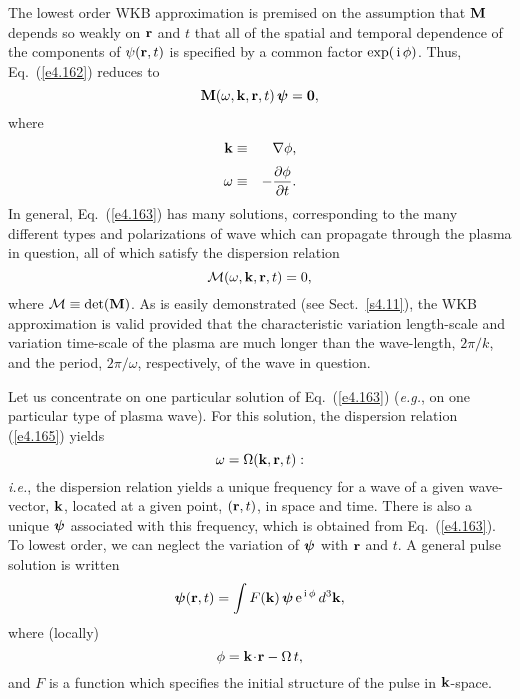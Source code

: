 The lowest order WKB  approximation  is premised on the assumption that
${\bf M}$ depends so weakly on ${\bf r}$ and $t$ that all of the
spatial and temporal dependence of the components of ${\bf \psi}({\bf r}, t)$
is specified by a common factor $\exp(\,{\rm i}\,\phi)$.
Thus,
Eq.~(\ref{e4.162}) reduces to
\begin{equation}\label{e4.163}
{\bf M}(\omega, {\bf k}, {\bf r}, t)\, {\mbox{\boldmath$\psi$}} = {\bf 0},
\end{equation}
where
\begin{eqnarray}\label{e4.164a}
{\bf k} &\equiv & \nabla\phi,\\[0.5ex]
\omega &\equiv & - \frac{\partial\phi}{\partial t}.\label{e4.164b}
\end{eqnarray}
In general, Eq.~(\ref{e4.163}) has many solutions, corresponding to the many different
types and polarizations of wave which can propagate through the plasma in question,
all of which satisfy the dispersion relation
\begin{equation}\label{e4.165}
{\cal M}(\omega,{\bf k}, {\bf r}, t) = 0,
\end{equation}
where ${\cal M} \equiv {\rm det}({\bf M})$. 
As is easily demonstrated (see Sect.~\ref{s4.11}), the WKB approximation is valid
provided that the characteristic
variation length-scale and variation time-scale of the plasma are much longer than
the wave-length, $2\pi/k$, and the period, $2\pi/\omega$, respectively,
of the wave in question.

Let us concentrate on one particular solution of Eq.~(\ref{e4.163}) ({\em e.g.},
on one particular type of plasma wave). For this solution, the dispersion
relation (\ref{e4.165}) yields
\begin{equation}\label{e4.166}
\omega = {\Omega}({\bf k}, {\bf r}, t):
\end{equation}
{\em i.e.}, the dispersion relation yields a
 unique frequency for a wave of a given wave-vector, ${\bf k}$, located
at a given point, $({\bf r}, t)$, in space and time. There is also a unique ${\mbox{\boldmath$\psi$}}$ associated
with this frequency, which is obtained from Eq.~(\ref{e4.163}). To lowest order, we can
neglect the variation of ${\mbox{\boldmath$\psi$}}$ with ${\bf r}$ and $t$. 
A general pulse solution is written
\begin{equation}\label{e4.167}
{\mbox{\boldmath$\psi$}}({\bf r}, t) = \int F({\bf k})\,{\mbox{\boldmath$\psi$}}\,{\rm e}^{\,{\rm i}\,
\phi}\,d^3{\bf k},
\end{equation}
where (locally)
\begin{equation}
\phi = {\bf k}\!\cdot\!{\bf r} - {\Omega}\,t,
\end{equation}
and $F$ is a function which specifies the initial structure of the pulse
in ${\bf k}$-space.

